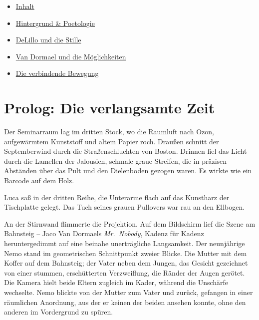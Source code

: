 \documentclass[
  ngerman,
]{article}
\providecommand{\tightlist}{%
  \setlength{\itemsep}{0pt}\setlength{\parskip}{0pt}}
\begin{document}
\begin{itemize}
  \begin{itemize}
  \tightlist
  \item
    \protect{}\label{toc-inhalt}\hyperref[inhalt]{Inhalt}
  \item
    \protect{}\label{toc-hintergrund-poetologie}\hyperref[hintergrund-poetologie]{Hintergrund
    \& Poetologie}
  \item
    \protect{}\label{toc-delillo-und-die-stille}\hyperref[delillo-und-die-stille]{DeLillo
    und die Stille}
  \item
    \protect{}\label{toc-van-dormael-und-die-muxf6glichkeiten}\hyperref[van-dormael-und-die-muxf6glichkeiten]{Van
    Dormael und die Möglichkeiten}
  \item
    \protect{}\label{toc-die-verbindende-bewegung}\hyperref[die-verbindende-bewegung]{Die
    verbindende Bewegung}
  \end{itemize}
\end{itemize}

\section{Prolog: Die verlangsamte
Zeit}\label{prolog-die-verlangsamte-zeit}

Der Seminarraum lag im dritten Stock, wo die Raumluft nach Ozon,
aufgewärmtem Kunststoff und altem Papier roch. Draußen schnitt der
Septemberwind durch die Straßenschluchten von Boston. Drinnen fiel das
Licht durch die Lamellen der Jalousien, schmale graue Streifen, die in
präzisen Abständen über das Pult und den Dielenboden gezogen waren. Es
wirkte wie ein Barcode auf dem Holz.

Luca saß in der dritten Reihe, die Unterarme flach auf das Kunstharz der
Tischplatte gelegt. Das Tuch seines grauen Pullovers war rau an den
Ellbogen.

An der Stirnwand flimmerte die Projektion. Auf dem Bildschirm lief die
Szene am Bahnsteig -- Jaco Van Dormaels \emph{Mr.~Nobody}, Kadenz für
Kadenz heruntergedimmt auf eine beinahe unerträgliche Langsamkeit. Der
neunjährige Nemo stand im geometrischen Schnittpunkt zweier Blicke. Die
Mutter mit dem Koffer auf dem Bahnsteig; der Vater neben dem Jungen, das
Gesicht gezeichnet von einer stummen, erschütterten Verzweiflung, die
Ränder der Augen gerötet. Die Kamera hielt beide Eltern zugleich im
Kader, während die Unschärfe wechselte. Nemo blickte von der Mutter zum
Vater und zurück, gefangen in einer räumlichen Anordnung, aus der er
keinen der beiden ansehen konnte, ohne den anderen im Vordergrund zu
spüren.
\end{document}
